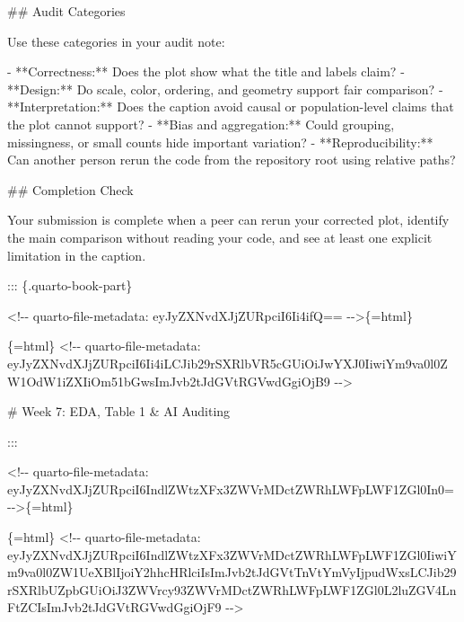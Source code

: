 \documentclass[
  letterpaper,
  DIV=11,
  numbers=noendperiod,
  oneside]{scrreprt}
\newenvironment{Shaded}{\begin{snugshade}}{\end{snugshade}}
\newcommand{\FunctionTok}[1]{\textcolor[rgb]{0.28,0.35,0.67}{#1}}
\newcommand{\InformationTok}[1]{\textcolor[rgb]{0.37,0.37,0.37}{#1}}
\newcommand{\NormalTok}[1]{\textcolor[rgb]{0.00,0.23,0.31}{#1}}
\newcommand{\SpecialStringTok}[1]{\textcolor[rgb]{0.13,0.47,0.30}{#1}}
\begin{document}
\begin{Shaded}
\begin{Highlighting}[numbers=left,,]
\FunctionTok{\#\# Audit Categories}

\NormalTok{Use these categories in your audit note:}

\SpecialStringTok{{-} }\NormalTok{**Correctness:** Does the plot show what the title and labels claim?}
\SpecialStringTok{{-} }\NormalTok{**Design:** Do scale, color, ordering, and geometry support fair comparison?}
\SpecialStringTok{{-} }\NormalTok{**Interpretation:** Does the caption avoid causal or population{-}level claims that the plot cannot support?}
\SpecialStringTok{{-} }\NormalTok{**Bias and aggregation:** Could grouping, missingness, or small counts hide important variation?}
\SpecialStringTok{{-} }\NormalTok{**Reproducibility:** Can another person rerun the code from the repository root using relative paths?}

\FunctionTok{\#\# Completion Check}

\NormalTok{Your submission is complete when a peer can rerun your corrected plot, identify the main comparison without reading your code, and see at least one explicit limitation in the caption.}


\NormalTok{::: \{.quarto{-}book{-}part\}}


\InformationTok{\textasciigrave{}\textless{}!{-}{-} quarto{-}file{-}metadata: eyJyZXNvdXJjZURpciI6Ii4ifQ== {-}{-}\textgreater{}\textasciigrave{}}\NormalTok{\{=html\}}

\InformationTok{\textasciigrave{}\textasciigrave{}\textasciigrave{}\{=html\}}
\InformationTok{\textless{}!{-}{-} quarto{-}file{-}metadata: eyJyZXNvdXJjZURpciI6Ii4iLCJib29rSXRlbVR5cGUiOiJwYXJ0IiwiYm9va0l0ZW1OdW1iZXIiOm51bGwsImJvb2tJdGVtRGVwdGgiOjB9 {-}{-}\textgreater{}}
\InformationTok{\textasciigrave{}\textasciigrave{}\textasciigrave{}}

\FunctionTok{\# Week 7: EDA, Table 1 \& AI Auditing}


\NormalTok{:::}



\InformationTok{\textasciigrave{}\textless{}!{-}{-} quarto{-}file{-}metadata: eyJyZXNvdXJjZURpciI6IndlZWtzXFx3ZWVrMDctZWRhLWFpLWF1ZGl0In0= {-}{-}\textgreater{}\textasciigrave{}}\NormalTok{\{=html\}}

\InformationTok{\textasciigrave{}\textasciigrave{}\textasciigrave{}\{=html\}}
\InformationTok{\textless{}!{-}{-} quarto{-}file{-}metadata: eyJyZXNvdXJjZURpciI6IndlZWtzXFx3ZWVrMDctZWRhLWFpLWF1ZGl0IiwiYm9va0l0ZW1UeXBlIjoiY2hhcHRlciIsImJvb2tJdGVtTnVtYmVyIjpudWxsLCJib29rSXRlbUZpbGUiOiJ3ZWVrcy93ZWVrMDctZWRhLWFpLWF1ZGl0L2luZGV4LnFtZCIsImJvb2tJdGVtRGVwdGgiOjF9 {-}{-}\textgreater{}}
\InformationTok{\textasciigrave{}\textasciigrave{}\textasciigrave{}}


\end{Highlighting}
\end{Shaded}
\end{document}
